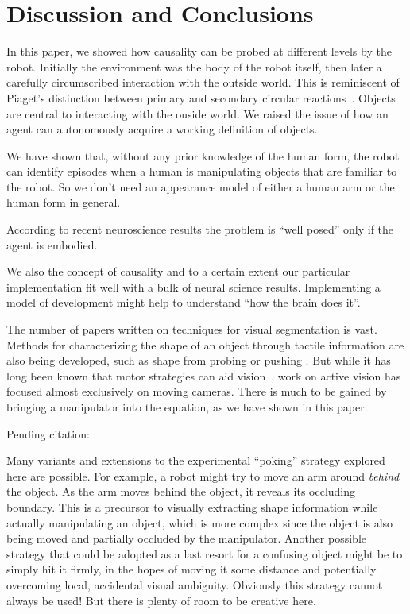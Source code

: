
\section{Discussion and Conclusions}

In this paper, we showed how causality can be probed at different
levels by the robot.  Initially the environment was the body of the
robot itself, then later a carefully circumscribed interaction with
the outside world.  This is reminiscent of Piaget's distinction
between primary and secondary circular
reactions~\cite{ginsburg78piaget}.  Objects are central to interacting
with the ouside world.  We raised the issue of how an agent can
autonomously acquire a working definition of objects. 

We have shown that, without any prior knowledge of the human form, 
the robot can identify episodes when a human is manipulating objects
that are familiar to the robot.  So we don't need an appearance model 
of either a human arm or the human form in general.

\ifverbose
According to
recent neuroscience results the problem is ``well posed'' only if the
agent is embodied.
\fi

\ifverbose
We also 
the concept of causality and to a certain extent
our particular implementation fit well with a bulk of neural science
results. Implementing a model of development might help to 
understand ``how the brain does it''.
\fi

The number of papers written on techniques for visual segmentation is
vast.  Methods for characterizing the shape of an object through
tactile information are also being developed, such as shape from
probing 
\cite{paulos99fast} 
or pushing
\cite{moll01reconstructing}.  
But while it has long
been known that motor strategies can aid
vision~\cite{ballard91animate}, work on active vision has focused
almost exclusively on moving cameras.  There is much to be gained by
bringing a manipulator into the equation, as we have shown in this
paper.  

Pending citation: \cite{tsikos91segmentation}.



\ifverbose
Many variants and extensions to the
experimental ``poking'' strategy explored here are possible.  For
example, a robot might try to move an arm around {\em behind} the
object.  As the arm moves behind the object, it reveals its occluding
boundary.  This is a precursor to visually extracting shape
information while actually manipulating an object, which is more
complex since the object is also being moved and partially occluded by
the manipulator.  Another possible strategy that could be adopted as a
last resort for a confusing object might be to simply hit it firmly,
in the hopes of moving it some distance and potentially overcoming
local, accidental visual ambiguity.  Obviously this strategy cannot
always be used!  But there is plenty of room to be creative here.
\fi




